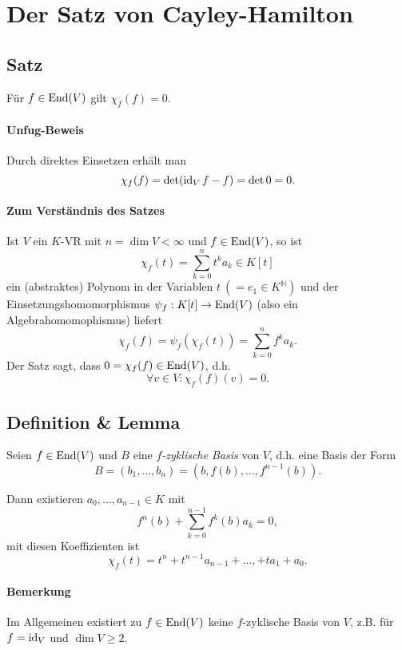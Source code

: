 \section{Der Satz von Cayley-Hamilton}
\subsection{Satz}
	Für $ f\in\operatorname{End}(V) $ gilt $ \chi_f(f) = 0$.
\paragraph{Unfug-Beweis}
	Durch direktes Einsetzen erhält man
		\[ \chi_f(f)=\det (\operatorname{id}_V f-f) = \det 0 = 0. \]
\paragraph{Zum Verständnis des Satzes}
	Ist $ V $ ein $ K $-VR mit $ n=\dim V < \infty $ und $ f\in \operatorname{End} (V) $, so ist
		\[ \chi_f(t) = \sum_{k=0}^{n}t^ka_k \in K[t] \]
	ein (abstraktes) Polynom in der Variablen $ t\ (= e_1\in K^\mathbb{N})$ und der Einsetzungshomomorphismus $ \psi_f:K[t]\to \operatorname{End}(V) $ (also ein Algebrahomomophismus) liefert
		\[ \chi_f(f) = \psi_f\left(\chi_f(t)\right) = \sum_{k=0}^{n}f^k a_k. \]
	Der Satz sagt, dass $ 0 = \chi_f(f)\in \operatorname{End}(V) $, d.h.
		\[ \forall v\in V: \chi_f(f)(v) = 0. \]
		
\subsection{Definition \& Lemma}
\begin{Definition}
	Seien $ f\in\operatorname{End}(V) $ und $ B $ eine \emph{$ f $-zyklische Basis} von $ V $, d.h. eine Basis der Form
		\[ B= (b_1,\dots,b_n) = \left(b,f(b),\dots,f^{n-1}(b)\right). \]		
\end{Definition}

\begin{Lemma}
	Dann existieren $ a_0,\dots,a_{n-1}\in K $ mit
		\[ f^n(b)+\sum_{k=0}^{n-1}f^k(b)a_k = 0, \]
	mit diesen Koeffizienten ist
		\[ \chi_f(t) = t^n+t^{n-1}a_{n-1}+\dots,+ta_1+a_0. \]
\end{Lemma}
\paragraph{Bemerkung}
	Im Allgemeinen existiert zu $ f\in \operatorname{End}(V) $ keine $ f $-zyklische Basis von $ V $, z.B. für $ f = \operatorname{id}_V $ und $ \dim V \geq 2 $.
